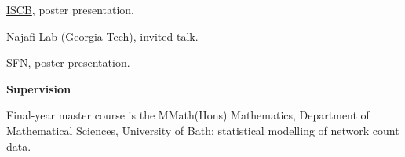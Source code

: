 \documentclass[11pt,usenames, dvipsnames]{article}
\begin{document}
\href{https://iscb2025.info/}{ISCB}, poster presentation.

\vspace{7pt}

 \href{https://www.najafilab.org/}{Najafi Lab} (Georgia Tech), invited talk.

\vspace{7pt}

 \href{https://www.sfn.org/Meetings/Neuroscience-2022}{SFN}, poster presentation.

\vspace{1.2cm}

{\large \bfseries \color{color_64493} Supervision}

\vspace{10pt}

   Final-year master course is the MMath(Hons) Mathematics, Department of Mathematical Sciences, University of Bath; statistical modelling of network count data.
\end{document}
